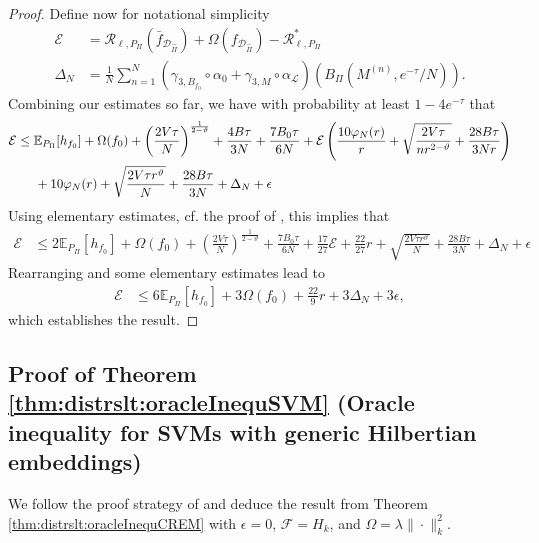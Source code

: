 \documentclass[letterpaper]{article} %
\newcommand{\E}{\mathbb{E}}
\newcommand{\dataSet}{\mathcal{D}}
\newcommand{\risk}{\mathcal{R}} %
\newcommand{\Risk}[2]{\risk_{{#1},{#2}}} %
\newcommand{\RiskBayes}[2]{\risk_{{#1},{#2}}^\ast} %
\newcommand{\LearningAlg}[1]{\mathcal{L}_{#1}}
\newcommand{\hilbertianEmbed}{\Pi} %
\newcommand{\regularizer}{\Omega}
\newcommand{\hilbertianEmbedBound}{B_\hilbertianEmbed} %
\newcommand{\clipped}[1]{\bar{#1}}
\begin{document}
\begin{proof}
Define now for notational simplicity
\begin{align*}
    \mathcal{E} & = \Risk{\ell}{P_\hilbertianEmbed}(\clipped{f}_{\dataSet_{\hat\hilbertianEmbed}}) 
    + \regularizer(f_{\dataSet_{\hat\hilbertianEmbed}}) - \RiskBayes{\ell}{P_\hilbertianEmbed}  \\
    \Delta_N & = \frac1N \sum_{n=1}^N 
    \left(\gamma_{3,B_{f_0}} \circ \alpha_0 + \gamma_{3,M} \circ \alpha_{\LearningAlg{}}\right)(\hilbertianEmbedBound(M^{(n)}, e^{-\tau}/N)).
\end{align*}
Combining our estimates so far, we have with probability at least $1-4e^{-\tau}$ that
\begin{align*}
    \mathcal{E} & \leq \E_{P_\hilbertianEmbed}[h_{f_0}] + \regularizer(f_0) + \left(\frac{2V\tau}{N}\right)^{\frac{1}{2-\vartheta}}
    + \frac{4B\tau}{3N} + \frac{7 B_0\tau}{6N} 
    + \mathcal{E}
        \left( \frac{10 \varphi_N (r)}{r} + \sqrt{\frac{2V \tau}{n r^{2 - \vartheta}}} + \frac{28 B \tau}{3Nr} \right) \\
    & \hspace{0.5cm} + 10 \varphi_N (r) + \sqrt{\frac{2V \tau r^{\vartheta}}{N}} + \frac{28 B \tau}{3N} + \Delta_N + \epsilon
\end{align*}
Using elementary estimates, cf. the proof of \cite[Theorem~7.20]{SC08}, this implies that
\begin{align*}
    \mathcal{E} & \leq 2\E_{P_\hilbertianEmbed}[h_{f_0}] + \regularizer(f_0)  + \left(\frac{2V\tau}{N}\right)^{\frac{1}{2-\vartheta}}
    + \frac{7 B_0\tau}{6N} 
    + \frac{17}{27}\mathcal{E} +\frac{22}{27}r + \sqrt{\frac{2V \tau r^{\vartheta}}{N}} + \frac{28 B \tau}{3N} + \Delta_N + \epsilon
\end{align*}
Rearranging and some elementary estimates lead to
\begin{align*}
    \mathcal{E} & \leq  6\E_{P_\hilbertianEmbed}[h_{f_0}] + 3\regularizer(f_0) + \frac{22}{9}r + 3\Delta_N + 3\epsilon,
\end{align*}
which establishes the result.
\end{proof}
\subsection{Proof of Theorem \ref{thm:distrslt:oracleInequSVM} (Oracle inequality for SVMs with generic Hilbertian embeddings)} \label{sec:distrslt:proofOforacleInequSVM}
We follow the proof strategy of \cite[Theorem~7.22]{SC08} and deduce the result from Theorem \ref{thm:distrslt:oracleInequCREM} with $\epsilon=0$, $\mathcal{F}=H_k$, and $\regularizer = \lambda \|\cdot\|_k^2$.
\end{document}
